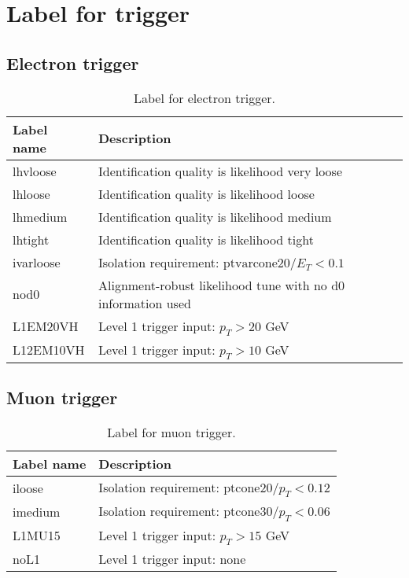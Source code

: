 \chapter{Label for trigger \cite{trigger2,trigger}}
\label{ch:appendixTwo}

\section{Electron trigger}

\begin{table}[htbp]
\begin{center}
\begin{tabular}{|l|l|}
\hline
Label name & Description \\
\hline
\hline
lhvloose & Identification quality is likelihood very loose \\
\hline
lhloose & Identification quality is likelihood loose \\
\hline
lhmedium & Identification quality is likelihood medium \\
\hline
lhtight & Identification quality is likelihood tight \\
\hline
ivarloose & Isolation requirement: $\text{ptvarcone20} / E_T < 0.1$ \\
\hline
nod0 & Alignment-robust likelihood tune with no d0 information used \\
\hline
L1EM20VH & Level 1 trigger input: $p_T > 20$ GeV \\
\hline
L12EM10VH & Level 1 trigger input: $p_T > 10$ GeV \\
\hline
\end{tabular}
\end{center}
\caption{Label for electron trigger.}
\end{table}

\section{Muon trigger}

\begin{table}[htbp]
\begin{center}
\begin{tabular}{|l|l|}
\hline
Label name & Description \\
\hline
\hline
iloose & Isolation requirement: $\text{ptcone20} / p_T < 0.12$ \\
\hline
imedium & Isolation requirement: $\text{ptcone30} / p_T < 0.06$ \\
\hline
L1MU15 & Level 1 trigger input: $p_T > 15$ GeV \\
\hline
noL1 & Level 1 trigger input: none \\
\hline
\end{tabular}
\end{center}
\caption{Label for muon trigger.}
\end{table}
